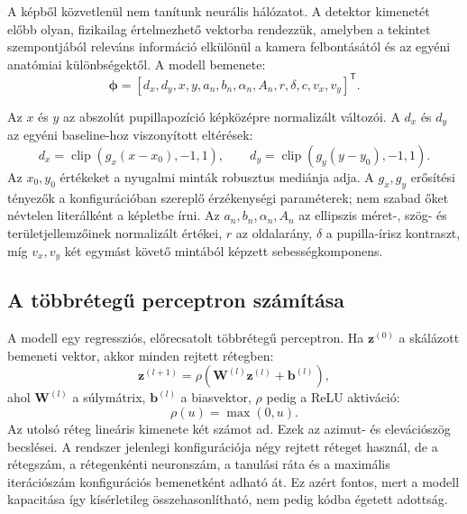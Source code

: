 \documentclass[12pt,a4paper,oneside]{book}
\begin{document}
A képből közvetlenül nem tanítunk neurális hálózatot. A detektor kimenetét előbb olyan, fizikailag értelmezhető vektorba rendezzük, amelyben a tekintet szempontjából releváns információ elkülönül a kamera felbontásától és az egyéni anatómiai különbségektől. A modell bemenete:
{\large
\begin{equation}
\boldsymbol{\phi} =
[d_x,d_y,x,y,a_n,b_n,\alpha_n,A_n,r,\delta,c,v_x,v_y]^\mathsf{T}.
\end{equation}
}%

Az $x$ és $y$ az abszolút pupillapozíció képközépre normalizált változói. A $d_x$ és $d_y$ az egyéni baseline-hoz viszonyított eltérések:
{\large
\begin{equation}
d_x = \operatorname{clip}\!\left(
g_x(x-x_0),-1,1\right), \qquad
d_y = \operatorname{clip}\!\left(
g_y(y-y_0),-1,1\right).
\end{equation}
}%
Az $x_0,y_0$ értékeket a nyugalmi minták robusztus mediánja adja. A $g_x,g_y$ erősítési tényezők a konfigurációban szereplő érzékenységi paraméterek; nem szabad őket névtelen literálként a képletbe írni. Az $a_n,b_n,\alpha_n,A_n$ az ellipszis méret-, szög- és területjellemzőinek normalizált értékei, $r$ az oldalarány, $\delta$ a pupilla-írisz kontraszt, míg $v_x,v_y$ két egymást követő mintából képzett sebességkomponens.

\subsection{A többrétegű perceptron számítása}

A modell egy regressziós, előrecsatolt többrétegű perceptron. Ha $\mathbf{z}^{(0)}$ a skálázott bemeneti vektor, akkor minden rejtett rétegben:
{\large
\begin{equation}
\mathbf{z}^{(l+1)}
= \rho\!\left(\mathbf{W}^{(l)}\mathbf{z}^{(l)}
+\mathbf{b}^{(l)}\right),
\end{equation}
}%
ahol $\mathbf{W}^{(l)}$ a súlymátrix, $\mathbf{b}^{(l)}$ a biasvektor, $\rho$ pedig a ReLU aktiváció:
{\large
\begin{equation}
\rho(u)=\max(0,u).
\end{equation}
}%
Az utolsó réteg lineáris kimenete két számot ad. Ezek az azimut- és elevációszög becslései. A rendszer jelenlegi konfigurációja négy rejtett réteget használ, de a rétegszám, a rétegenkénti neuronszám, a tanulási ráta és a maximális iterációszám konfigurációs bemenetként adható át. Ez azért fontos, mert a modell kapacitása így kísérletileg összehasonlítható, nem pedig kódba égetett adottság.
\end{document}
